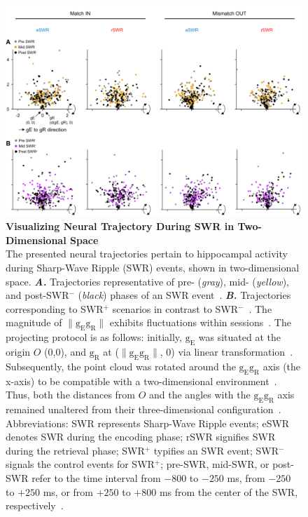 \documentclass[final,3p,times,twocolumn]{elsarticle}
\begin{document}
        \begin{figure}[ht]
        	\centering
            \includegraphics[width=1\textwidth]{./src/figures/.png/Figure_ID_06.png}
        	\caption{\textbf{
Visualizing Neural Trajectory During SWR in Two-Dimensional Space
}
\smallskip
\\
The presented neural trajectories pertain to hippocampal activity during Sharp-Wave Ripple (SWR) events, shown in two-dimensional space. \textbf{\textit{A.}} Trajectories representative of pre- (\textit{gray}), mid- (\textit{yellow}), and post-SWR$^-$ (\textit{black}) phases of an SWR event~\cite{buzsaki_hippocampal_2015}. \textbf{\textit{B.}} Trajectories corresponding to SWR$^+$ scenarios in contrast to SWR$^-$~\cite{fernandez-ruiz_long-duration_2019}. The magnitude of $\lVert \mathrm{g_{E}g_{R}} \rVert$ exhibits fluctuations within sessions~\cite{liu_consensus_2022}. The projecting protocol is as follows: initially, $\mathrm{g_{E}}$ was situated at the origin $O$ (0,0), and $\mathrm{g_{R}}$ at ($\lVert \mathrm{g_{E}g_{R}} \rVert$, 0) via linear transformation~\cite{kim_corticalhippocampal_2022}. Subsequently, the point cloud was rotated around the $\mathrm{g_{E}g_{R}}$ axis (the x-axis) to be compatible with a two-dimensional environment~\cite{yu_gaussian-process_2009}. Thus, both the distances from $O$ and the angles with the $\mathrm{g_{E}g_{R}}$ axis remained unaltered from their three-dimensional configuration~\cite{mcinnes_umap_2018}. Abbreviations: SWR represents Sharp-Wave Ripple events; eSWR denotes SWR during the encoding phase; rSWR signifies SWR during the retrieval phase; SWR$^+$ typifies an SWR event; SWR$^-$ signals the control events for SWR$^+$; pre-SWR, mid-SWR, or post-SWR refer to the time interval from $-800$ to $-250$ ms, from $-250$ to $+250$ ms, or from $+250$ to $+800$ ms from the center of the SWR, respectively~\cite{zhang_hippocampal_2022}.
}
        	\label{fig:06}
        \end{figure}
\end{document}
